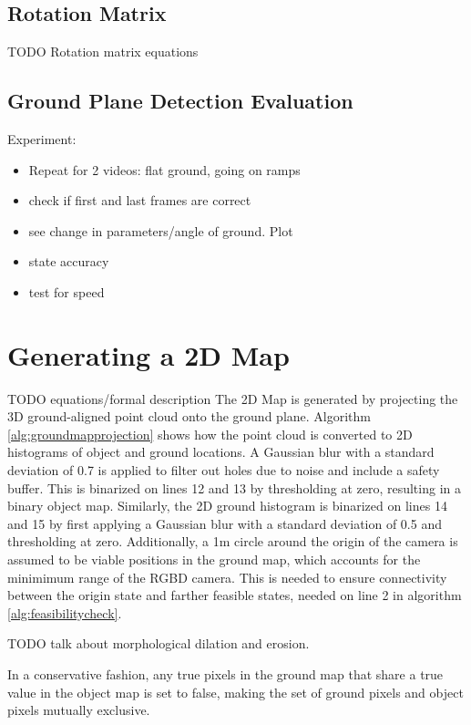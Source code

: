 \subsection{Rotation Matrix}
TODO Rotation matrix equations

\subsection{Ground Plane Detection Evaluation}
Experiment: 
\begin{itemize}
\item Repeat for 2 videos: flat ground, going on ramps
\item check if first and last frames are correct
\item see change in parameters/angle of ground. Plot
\item state accuracy
\item test for speed
\end{itemize}

\section{Generating a 2D Map}
\label{sec:2dmap}
TODO equations/formal description
The 2D Map is generated by projecting the 3D ground-aligned point cloud onto the
ground plane.
Algorithm \autoref{alg:groundmapprojection} shows how the point cloud is
converted to 2D histograms of object and ground locations. 
A Gaussian blur with
a standard deviation of 0.7 is applied to filter out holes due to noise and
include a safety buffer. This is binarized on lines 12 and 13 by thresholding at
zero, resulting in a binary object map.
Similarly, the 2D ground histogram is binarized on lines 14 and 15 by first applying a Gaussian
blur with a standard deviation of 0.5 and thresholding at zero. 
Additionally, a 1m circle around the origin of the camera is assumed to be
viable positions in the ground map, which accounts for the minimimum range of
the RGBD camera. This is needed to ensure connectivity between the origin state
and farther feasible states, needed on line 2 in algorithm
\autoref{alg:feasibilitycheck}.

TODO talk about morphological dilation and erosion.

In a conservative fashion, any true pixels in the ground map that share a true
value in the object map is set to false, making the set of ground pixels and
object pixels mutually exclusive. 

